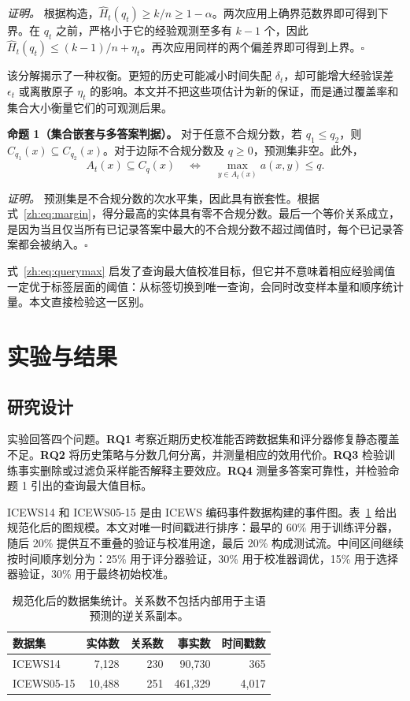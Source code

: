 \documentclass[UTF8,a4paper,11pt]{ctexart}
\begin{document}
\emph{证明。}
根据构造，\(\widehat H_t(q_t)\ge k/n\ge1-\alpha\)。两次应用上确界范数界即可得到下界。在 \(q_t\) 之前，严格小于它的经验观测至多有 \(k-1\) 个，因此 \(\widehat H_t(q_t)\le(k-1)/n+\eta_t\)。再次应用同样的两个偏差界即可得到上界。\hfill\(\square\)

该分解揭示了一种权衡。更短的历史可能减小时间失配 \(\delta_t\)，却可能增大经验误差 \(\epsilon_t\) 或离散原子 \(\eta_t\) 的影响。本文并不把这些项估计为新的保证，而是通过覆盖率和集合大小衡量它们的可观测后果。

\noindent\textbf{命题 1（集合嵌套与多答案判据）。}\quad
对于任意不合规分数，若 \(q_1\le q_2\)，则 \(C_{q_1}(x)\subseteq C_{q_2}(x)\)。对于边际不合规分数及 \(q\ge0\)，预测集非空。此外，
\[
 A_t(x)\subseteq C_q(x)
 \quad\Longleftrightarrow\quad
 \max_{y\in A_t(x)}a(x,y)\le q.
 \tag{6}\label{zh:eq:querymax}
\]

\emph{证明。}
预测集是不合规分数的次水平集，因此具有嵌套性。根据式~\eqref{zh:eq:margin}，得分最高的实体具有零不合规分数。最后一个等价关系成立，是因为当且仅当所有已记录答案中最大的不合规分数不超过阈值时，每个已记录答案都会被纳入。\hfill\(\square\)

式~\eqref{zh:eq:querymax} 启发了查询最大值校准目标，但它并不意味着相应经验阈值一定优于标签层面的阈值：从标签切换到唯一查询，会同时改变样本量和顺序统计量。本文直接检验这一区别。

\section{实验与结果}

\subsection{研究设计}

实验回答四个问题。\textbf{RQ1} 考察近期历史校准能否跨数据集和评分器修复静态覆盖不足。\textbf{RQ2} 将历史策略与分数几何分离，并测量相应的效用代价。\textbf{RQ3} 检验训练事实删除或过滤负采样能否解释主要效应。\textbf{RQ4} 测量多答案可靠性，并检验命题 1 引出的查询最大值目标。

ICEWS14 和 ICEWS05-15 是由 ICEWS 编码事件数据构建的事件图\cite{boschee2015icews}。表~\ref{zh:tab:data} 给出规范化后的图规模。本文对唯一时间戳进行排序：最早的 60\% 用于训练评分器，随后 20\% 提供互不重叠的验证与校准用途，最后 20\% 构成测试流。中间区间继续按时间顺序划分为：25\% 用于评分器验证，30\% 用于校准器调优，15\% 用于选择器验证，30\% 用于最终初始校准。

\begin{table}[htbp]
\centering
\caption{规范化后的数据集统计。关系数不包括内部用于主语预测的逆关系副本。}
\label{zh:tab:data}
\begin{tabular}{lrrrr}
\toprule
数据集 & 实体数 & 关系数 & 事实数 & 时间戳数\\
\midrule
ICEWS14 & 7,128 & 230 & 90,730 & 365\\
ICEWS05-15 & 10,488 & 251 & 461,329 & 4,017\\
\bottomrule
\end{tabular}
\end{table}
\end{document}
